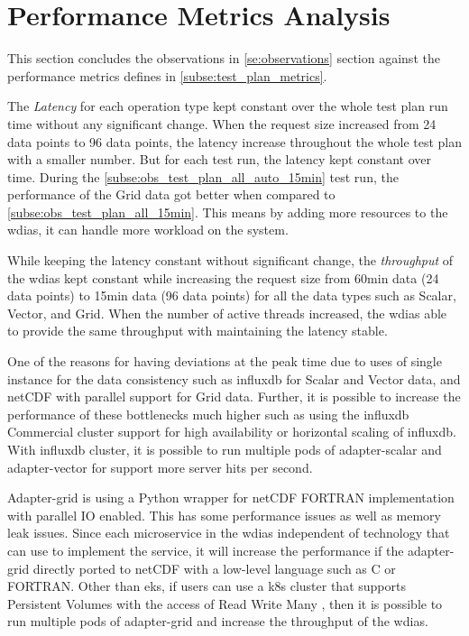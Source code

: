\section{Performance Metrics Analysis}
\label{se:discussion}

This section concludes the observations in \cref{se:observations} section against the performance metrics defines in \cref{subse:test_plan_metrics}.

The \emph{Latency} for each operation type kept constant over the whole test plan run time without any significant change. When the request size increased from 24 data points to 96 data points, the latency increase throughout the whole test plan with a smaller number. But for each test run, the latency kept constant over time.
During the \cref{subse:obs_test_plan_all_auto_15min} test run, the performance of the Grid data got better when compared to \cref{subse:obs_test_plan_all_15min}. This means by adding more resources to the \acrshort{wdias}, it can handle more workload on the system.

While keeping the latency constant without significant change, the \emph{throughput} of the \acrshort{wdias} kept constant while increasing the request size from 60min data (24 data points) to 15min data (96 data points) for all the data types such as Scalar, Vector, and Grid.
When the number of active threads increased, the \acrshort{wdias} able to provide the same throughput with maintaining the latency stable.

One of the reasons for having deviations at the peak time due to uses of single instance for the data consistency such as \acrshort{influxdb} for Scalar and Vector data, and netCDF with parallel support for Grid data. Further, it is possible to increase the performance of these bottlenecks much higher such as using the \acrshort{influxdb} Commercial cluster support for high availability or horizontal scaling of \acrshort{influxdb}. With \acrshort{influxdb} cluster, it is possible to run multiple pods of adapter-scalar and adapter-vector for support more server hits per second.

Adapter-grid is using a Python wrapper for netCDF FORTRAN implementation with parallel IO enabled. This has some performance issues as well as memory leak issues. Since each microservice in the \acrshort{wdias} independent of technology that can use to implement the service, it will increase the performance if the adapter-grid directly ported to netCDF with a low-level language such as C or FORTRAN.
Other than \acrshort{eks}, if users can use a \acrshort{k8s} cluster that supports Persistent Volumes with the access of Read Write  Many \cite{LinuxFoundationPersistentKubernetes} , then it is possible to run multiple pods of adapter-grid and increase the throughput of the \acrshort{wdias}.

